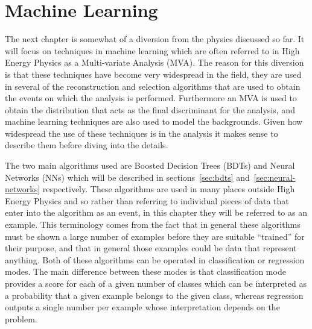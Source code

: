 \chapter{Machine Learning}%
\label{ch:ml}

The next chapter is somewhat of a diversion from the physics discussed so far.
It will focus on techniques in machine learning which are often referred to in
High Energy Physics as a Multi-variate Analysis (MVA). The reason for this
diversion is that these techniques have become very widespread in the field,
they are used in several of the reconstruction and selection algorithms that are
used to obtain the events on which the analysis is performed. Furthermore an MVA
is used to obtain the distribution that acts as the final discriminant for the
analysis, and machine learning techniques are also used to model the
backgrounds. Given how widespread the use of these techniques is in the analysis
it makes sense to describe them before diving into the details.

The two main algorithms used are Boosted Decision Trees (BDTs) and Neural
Networks (NNs) which will be described in sections~\ref{sec:bdts}
and~\ref{sec:neural-networks} respectively. These algorithms are used in many
places outside High Energy Physics and so rather than referring to individual
pieces of data that enter into the algorithm as an event, in this chapter they
will be referred to as an example. This terminology comes from the fact that in
general these algorithms must be shown a large number of examples before they
are suitable ``trained'' for their purpose, and that in general those examples
could be data that represent anything. Both of these algorithms can be operated
in classification or regression modes. The main difference between these modes
is that classification mode provides a score for each of a given number of
classes which can be interpreted as a probability that a given example belongs
to the given class, whereas regression outputs a single number per example whose
interpretation depends on the problem.

